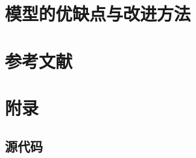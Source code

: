 \documentclass[UTF8]{ctexart}
\begin{document}
  \newpage

  \section{模型的优缺点与改进方法}

  \newpage

  \section{参考文献}

  \newpage

  \appendix
  \setcounter{secnumdepth}{-2} 
  \section{附录}

  \setcounter{secnumdepth}{3} 
  \subsection{源代码}
\end{document}
